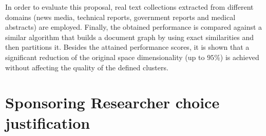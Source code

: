 \documentclass[10pt]{article}
\begin{document}
In order to evaluate this proposal, real text collections extracted from different domains (news media, technical reports, government reports and medical abstracts) are employed. Finally, the obtained performance is compared against a similar algorithm that builds a document graph by using exact similarities and then partitions it. Besides the attained performance scores, it is shown that a significant reduction of the original space dimensionality (up to $95\%$) is achieved without affecting the quality of the defined clusters.

\section{Sponsoring Researcher choice justification}

\end{document}
